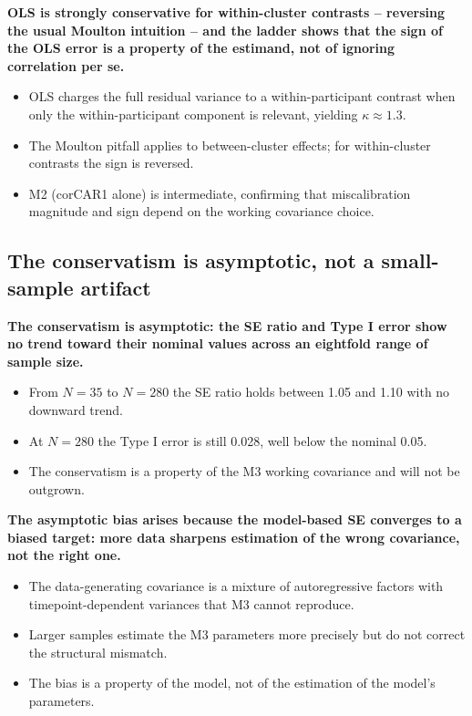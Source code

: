 \documentclass[
  11pt,
]{article}
\begin{document}
\textbf{OLS is strongly conservative for within-cluster contrasts -- reversing the usual Moulton intuition -- and the ladder shows that the sign of the OLS error is a property of the estimand, not of ignoring correlation per se.}

\begin{itemize}\setlength{\itemsep}{2pt}\setlength{\parskip}{0pt}
\item OLS charges the full residual variance to a within-participant contrast when only the within-participant component is relevant, yielding $\kappa \approx 1.3$.
\item The Moulton pitfall applies to between-cluster effects; for within-cluster contrasts the sign is reversed.
\item M2 (corCAR1 alone) is intermediate, confirming that miscalibration magnitude and sign depend on the working covariance choice.
\end{itemize}

\subsection{The conservatism is asymptotic, not a small-sample artifact}\label{the-conservatism-is-asymptotic-not-a-small-sample-artifact}

\textbf{The conservatism is asymptotic: the SE ratio and Type I error show no trend toward their nominal values across an eightfold range of sample size.}

\begin{itemize}\setlength{\itemsep}{2pt}\setlength{\parskip}{0pt}
\item From $N = 35$ to $N = 280$ the SE ratio holds between 1.05 and 1.10 with no downward trend.
\item At $N = 280$ the Type I error is still 0.028, well below the nominal 0.05.
\item The conservatism is a property of the M3 working covariance and will not be outgrown.
\end{itemize}

\textbf{The asymptotic bias arises because the model-based SE converges to a biased target: more data sharpens estimation of the wrong covariance, not the right one.}

\begin{itemize}\setlength{\itemsep}{2pt}\setlength{\parskip}{0pt}
\item The data-generating covariance is a mixture of autoregressive factors with timepoint-dependent variances that M3 cannot reproduce.
\item Larger samples estimate the M3 parameters more precisely but do not correct the structural mismatch.
\item The bias is a property of the model, not of the estimation of the model's parameters.
\end{itemize}
\end{document}
